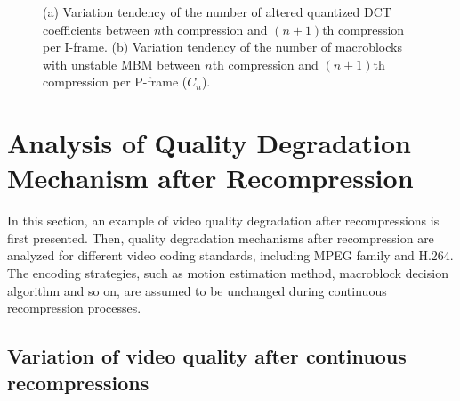 \documentclass[journal,sort]{IEEEtran}
\begin{document}
\begin{figure}[ht!]
	\centering
	\caption{(a) Variation tendency of the number of altered quantized DCT
		coefficients between $n$th compression and $(n+1)$th compression per I-frame. 
		(b) Variation tendency of the number of macroblocks with unstable MBM between $n$th compression and $(n+1)$th compression per P-frame ($C_n$).
		}
	\label{fig:statistics}
\end{figure}


\section{Analysis of Quality Degradation Mechanism after Recompression}

In this section, an example of video quality degradation after recompressions is first presented. Then, quality degradation mechanisms after recompression are analyzed for different video coding standards, including MPEG family and H.264. The encoding strategies, such as motion estimation method, macroblock decision algorithm and so on, are assumed to be unchanged during continuous recompression processes.

\subsection{Variation of video quality after continuous recompressions}
\end{document}
